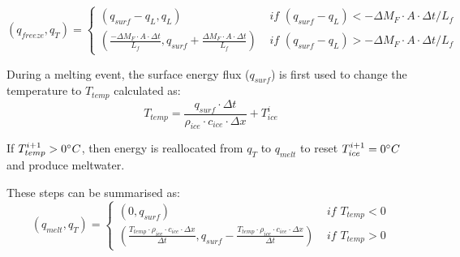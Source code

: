 \documentclass[utf8]{frontiersSCNS} %
\begin{document}
\begin{equation} 
    (q_{freeze}, q_{T}) = \left\{ \begin{array}{ll}
            (q_{surf}-q_{L}, q_{L}) & \textit{ if } (q_{surf}-q_{L})< -\Delta M_{F} \cdot A \cdot \Delta
t/L_f \\
(\frac{-\Delta M_{F} \cdot A \cdot \Delta
        t}{L_f}, q_{surf}+\frac{\Delta M_{F} \cdot A \cdot \Delta
        t}{L_f}) & \textit{ if } (q_{surf}-q_{L})> -\Delta M_{F} \cdot A \cdot \Delta
t/L_f 
    \end{array} \right. 
\end{equation} 

During a melting event, the surface energy flux ($q_{surf}$) is first used to change the temperature to $T_{temp}$
calculated as:
\begin{equation} T_{temp} =\frac{q_{surf} \cdot \Delta t}{\rho_{ice} \cdot c_{ice} \cdot \Delta x} + T_{ice}^{i} \end{equation}

If $T_{temp}^{i+1} > 0 \degree C$, then energy is reallocated from $q_{T}$ to $q_{melt}$ to reset $T_{ice}^{i+1} = 0
\degree C$ and produce meltwater.

These steps can be summarised as:
\begin{equation} 
    (q_{melt}, q_{T}) = \left\{ \begin{array}{ll}
            (0, q_{surf}) & \textit{ if } T_{temp} < 0\\
            (\frac{T_{temp} \cdot \rho_{ice} \cdot c_{ice} \cdot \Delta x}{\Delta t}, q_{surf}-\frac{T_{temp} \cdot \rho_{ice} \cdot c_{ice} \cdot \Delta x}{\Delta t}  ) & \textit{ if } T_{temp} > 0
    \end{array} \right.  
\end{equation} 
\end{document}
